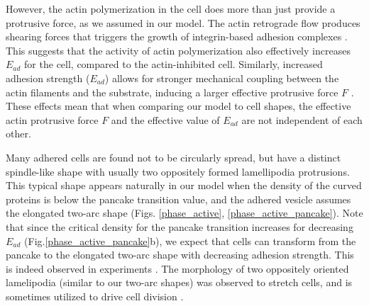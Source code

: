 \documentclass[pre,amsmath]{revtex4}
\begin{document}
However, the actin polymerization in the cell does more than just provide a protrusive force, as we assumed in our model. The actin retrograde flow produces shearing forces that triggers the growth of integrin-based adhesion complexes \cite{cavalcanti2007cell,schaufler2016selective}. This suggests that the activity of actin polymerization also effectively increases $E_{ad}$ for the cell, compared to the actin-inhibited cell. Similarly, increased adhesion strength ($E_{ad}$) allows for stronger mechanical coupling between the actin filaments and the substrate, inducing a larger effective protrusive force $F$ \cite{chan2008traction,gong2018matching}. These effects mean that when comparing our model to cell shapes, the effective actin protrusive force $F$ and the effective value of $E_{ad}$ are not independent of each other. 

Many adhered cells are found not to be circularly spread, but have a distinct spindle-like shape with usually two oppositely formed lamellipodia protrusions. This typical shape appears naturally in our model when the density of the curved proteins is below the pancake transition value, and the adhered vesicle assumes the elongated two-arc shape (Figs. \ref{phase_active}, \ref{phase_active_pancake}). Note that since the critical density for the pancake transition increases for decreasing $E_{ad}$ (Fig.\ref{phase_active_pancake}b), we expect that cells can transform from the pancake to the elongated two-arc shape with decreasing adhesion strength. This is indeed observed in experiments \cite{cavalcanti2007cell,schaufler2016selective,singh2020cell}. The morphology of two oppositely oriented lamelipodia (similar to our two-arc shapes) was observed to stretch cells, and is sometimes utilized to drive cell division \cite{kee2012mechanosensory,flemming2020cortical}.
\end{document}
